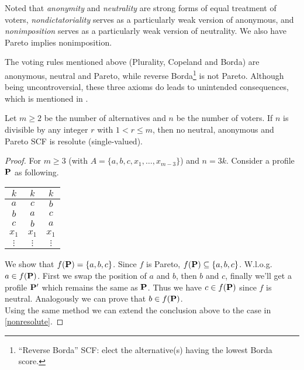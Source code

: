 Noted that \textit{anonymity} and \textit{neutrality} are strong forms of equal treatment of voters, \textit{nondictatoriality} serves as a particularly weak version of anonymous, and \textit{nonimposition} serves as a particularly weak version of neutrality. We also have Pareto implies nonimposition.

The voting rules mentioned above (Plurality, Copeland and Borda) are anonymous, neutral and Pareto, while reverse Borda\footnote{“Reverse Borda” SCF: elect the alternative(s) having the lowest Borda score.} is not Pareto. Although being uncontroversial, these three axioms do leads to unintended consequences, which is mentioned in \cite{moulinStrategySocialChoice2015}. 

\begin{proposition}
    \label{nonresolute}
    Let $m \geq 2$ be the number of alternatives and $n$ be the number of voters. If $n$ is divisible by any integer $r$ with $1 < r \leq m$, then no neutral, anonymous and Pareto SCF is resolute (single-valued).
\end{proposition}

\begin{proof}
    For $m \geq 3$ (with $A = \{a,b,c,x_1,\dots,x_{m-3}\}$) and $n = 3k$. Consider a profile $\mathbf{P}$ as following.
    \begin{center}
        \begin{tabular}{ccc}
            $k$ & $k$ & $k$\\
            \hline
            $a$ & $c$ & $b$\\
            $b$ & $a$ & $c$\\
            $c$ & $b$ & $a$\\
            $x_1$ & $x_1$ & $x_1$\\
            $\vdots$ & $\vdots$ & $\vdots$
        \end{tabular}
    \end{center}
    We show that $f(\mathbf{P}) = \{a,b,c\}$.
    Since $f$ is Pareto, $f(\mathbf{P}) \subseteq \{a,b,c\}$. W.l.o.g. $a \in f(\mathbf{P})$. First we swap the position of $a$ and $b$, then $b$ and $c$, finally we'll get a profile $\mathbf{P}'$ which remains the same as $\mathbf{P}$. Thus we have $c \in f(\mathbf{P})$ since $f$ is neutral. Analogously we can prove that $b \in f(\mathbf{P})$. \\
    Using the same method we can extend the conclusion above to the case in \cref{nonresolute}.
\end{proof}

